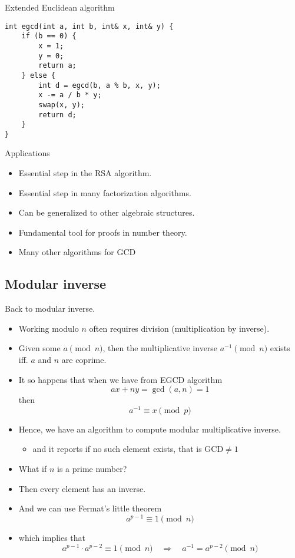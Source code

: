 \documentclass[12pt,t]{beamer}
\newcommand{\bi}{\begin{itemize}}
\newcommand{\ei}{\end{itemize}}
\begin{document}
\begin{frame}[fragile]{Extended Euclidean algorithm}
  \vspace{10pt}
    \begin{verbatim}
int egcd(int a, int b, int& x, int& y) {
    if (b == 0) {
        x = 1;
        y = 0;
        return a;
    } else {
        int d = egcd(b, a % b, x, y);
        x -= a / b * y;
        swap(x, y);
        return d;
    }
}
    \end{verbatim}
\end{frame}

\begin{frame}{Applications}
  \vspace{40pt}
  \bi
    \item Essential step in the RSA algorithm.
    \item Essential step in many factorization algorithms.
    \item Can be generalized to other algebraic structures.
    \item Fundamental tool for proofs in number theory.
    \item Many other algorithms for GCD
  \ei
\end{frame}

\subsection{Modular inverse}
\begin{frame}
  \vspace{20pt}
  Back to modular inverse.
  \bi
    \item Working modulo $n$ often requires division (multiplication by inverse).
    \item Given some $a \pmod{n}$, then the multiplicative inverse $a^{-1}
      \pmod{n}$ exists iff. $a$ and $n$ are coprime.
    \item It so happens that when we have from EGCD algorithm
      \[
        ax + ny = \gcd(a,n) = 1
      \]
      then \[ a^{-1} \equiv x \pmod{p} \]
  \ei
\end{frame}

\begin{frame}
  \vspace{20pt}
  \bi
    \item Hence, we have an algorithm to compute modular multiplicative inverse.
      \bi
        \item and it reports if no such element exists, that is $\text{GCD} \neq 1$
      \ei
    \item What if $n$ is a prime number?
    \item Then every element has an inverse.
  \item And we can use Fermat's little theorem
    \[
      a^{p-1} \equiv 1 \pmod{n}
    \]
  \item which implies that
    \[
      a^{p-1}\cdot a^{p-2} \equiv 1 \pmod{n} \quad\Rightarrow\quad a^{-1} = a^{p-2} \pmod{n}
    \]
  \ei
\end{frame}
\end{document}
